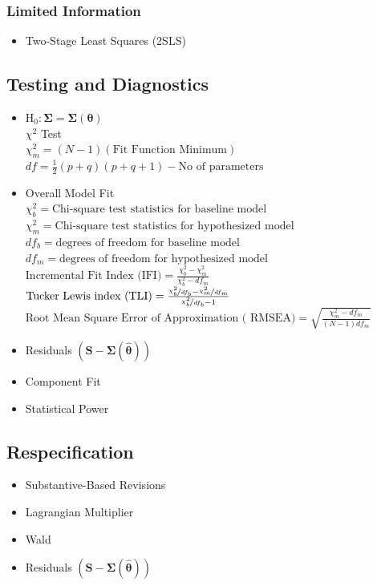 \subsubsection{Limited Information}
\begin{itemize}
\item Two-Stage Least Squares (2SLS)
\end{itemize}

\subsection{Testing and Diagnostics}
\begin{itemize}
\item $\text{H}_{0}:\bm{\Sigma}=\bm{\Sigma}\left(\bm{\theta}\right)$\\
$\chi^{2}$ Test\\
$\chi_{m}^{2}=\left(N-1\right)\left(\text{Fit Function Minimum}\right)$\\
$df=\frac{1}{2}\left(p+q\right)\left(p+q+1\right)-\text{No of parameters}$
\item Overall Model Fit\\
$\chi_{b}^{2}=\text{Chi-square test statistics for baseline model}$\\
$\chi_{m}^{2}=\text{Chi-square test statistics for hypothesized model}$\\
$df_{b}=\text{degrees of freedom for baseline model}$\\
$df_{m}=\text{degrees of freedom for hypothesized model}$\\
$\text{Incremental Fit Index (IFI)}=\frac{\chi_{b}^{2}-\chi_{m}^{2}}{\chi_{b}^{2}-df_{m}}$\\
$\text{Tucker Lewis index (TLI)}=\frac{\nicefrac{\chi_{b}^{2}}{df_{b}}-\nicefrac{\chi_{m}^{2}}{df_{m}}}{\nicefrac{\chi_{b}^{2}}{df_{b}}-1}$\\
$\text{Root Mean Square Error of Approximation ( RMSEA)}=\sqrt{\frac{\chi_{m}^{2}-df_{m}}{\left(N-1\right)df_{m}}}$
\item Residuals $\left(\mathbf{S}-\bm{\Sigma}\left(\widehat{\bm{\theta}}\right)\right)$
\item Component Fit
\item Statistical Power
\end{itemize}

\subsection{Respecification}
\begin{itemize}
\item Substantive-Based Revisions
\item Lagrangian Multiplier
\item Wald
\item Residuals $\left(\mathbf{S}-\bm{\Sigma}\left(\widehat{\bm{\theta}}\right)\right)$
\end{itemize}

